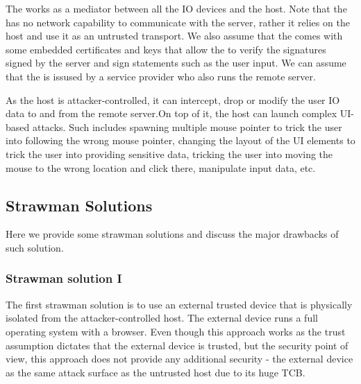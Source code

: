 The \device works as a mediator between all the IO devices and the host. Note that the \device has no network capability to communicate with the server, rather it relies on the host and use it as an untrusted transport. We also assume that the \device comes with some embedded certificates and keys that allow the \device to verify the signatures signed by the server and sign statements such as the user input. We can assume that the \device is issused by a service provider who also runs the remote server.

 As the host is attacker-controlled, it can intercept, drop or modify the user IO data to and from the remote server.On top of it, the host can launch complex UI-based attacks. Such includes spawning multiple mouse pointer to trick the user into following the wrong mouse pointer, changing the layout of the UI elements to trick the user into providing sensitive data, tricking the user into moving the mouse to the wrong location and click there, manipulate input data, etc.

\iffalse
\begin{figure}[t]
\centering
\texttt{[image: screenPartition.pdf]}
\caption{\textbf{\device's pointer tracking, pointer \& UI overlay, and security properties.} Our proposed method provides two layers of protection for IO to the user. 1. In all the parts of the screen, the \device provide pointer integrity (the gray part). 2. The green part of the screen where the \device overlays on the HDMI stream where the \device provide integrity and privacy (privacy is dependent on the application requirements) for the IO.}
\spacesave
\label{fig:screenPartition}
\centering
\end{figure}
\fi


\subsection{Strawman Solutions}
\label{sec:approach:strawman}

Here we provide some strawman solutions and discuss the major drawbacks of such solution.

\subsubsection{\bfseries Strawman solution I}
\label{sec:approach:strawman:1}

The first strawman solution is to use an external trusted device that is physically isolated from the attacker-controlled host. The external device runs a full operating system with a browser. Even though this approach works as the trust assumption dictates that the external device is trusted, but the security point of view, this approach does not provide any additional security - the external device as the same attack surface as the untrusted host due to its huge TCB.

